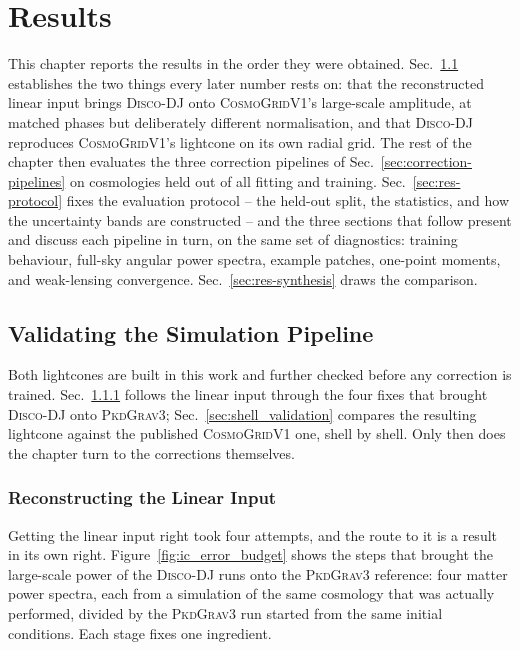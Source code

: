 \documentclass{report}
\begin{document}
\chapter{Results}
\label{ch:results}

This chapter reports the results in the order they were obtained. Sec.~\ref{sec:res-validation} establishes the two things every later number rests on: that the reconstructed linear input brings \textsc{Disco-DJ} onto \textsc{CosmoGridV1}'s large-scale amplitude, at matched phases but deliberately different normalisation, and that \textsc{Disco-DJ} reproduces \textsc{CosmoGridV1}'s lightcone on its own radial grid. The rest of the chapter then evaluates the three correction pipelines of Sec.~\ref{sec:correction-pipelines} on cosmologies held out of all fitting and training. Sec.~\ref{sec:res-protocol} fixes the evaluation protocol -- the held-out split, the statistics, and how the uncertainty bands are constructed -- and the three sections that follow present and discuss each pipeline in turn, on the same set of diagnostics: training behaviour, full-sky angular power spectra, example patches, one-point moments, and weak-lensing convergence. Sec.~\ref{sec:res-synthesis} draws the comparison.

\section{Validating the Simulation Pipeline}
\label{sec:res-validation}

Both lightcones are built in this work and further checked before any correction is trained. Sec.~\ref{subsec:res-ic} follows the linear input through the four fixes that brought \textsc{Disco-DJ} onto \textsc{PkdGrav3}; Sec.~\ref{sec:shell_validation}
compares the resulting lightcone against the published \textsc{CosmoGridV1} one, shell by shell. Only then does the chapter turn to the corrections themselves.

\subsection{Reconstructing the Linear Input}
\label{subsec:res-ic}

Getting the linear input right took four attempts, and the route to it is a result in its
own right. Figure~\ref{fig:ic_error_budget} shows the steps that brought the large-scale power
of the \textsc{Disco-DJ} runs onto the \textsc{PkdGrav3} reference: four matter power spectra,
each from a simulation of the same cosmology that was actually performed, divided by the
\textsc{PkdGrav3} run started from the same initial conditions. Each stage fixes one ingredient.
\end{document}
